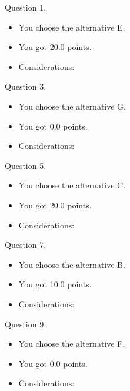 \documentclass[12pt, addpoints]{exam}
\begin{document}
    \begin{questions}
\question Question 1.\begin{itemize}\item You choose the alternative E.\item You got 20.0 points.\item Considerations: \end{itemize}\question Question 3.\begin{itemize}\item You choose the alternative G.\item You got 0.0 points.\item Considerations: \end{itemize}\question Question 5.\begin{itemize}\item You choose the alternative C.\item You got 20.0 points.\item Considerations: \end{itemize}\question Question 7.\begin{itemize}\item You choose the alternative B.\item You got 10.0 points.\item Considerations: \end{itemize}\question Question 9.\begin{itemize}\item You choose the alternative F.\item You got 0.0 points.\item Considerations: \end{itemize}\end{questions}
\end{document}
